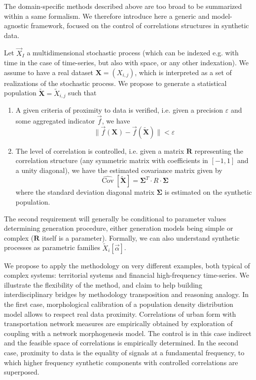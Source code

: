 \documentclass{bmcart}
\DeclareMathOperator{\Cov}{Cov}
\newcommand{\norm}[1]{\| #1 \|}
\begin{document}
The domain-specific methods described above are too broad to be summarized within a same formalism. We therefore introduce here a generic and model-agnostic framework, focused on the control of correlations structures in synthetic data.

Let $\vec{X}_I$ a multidimensional stochastic process (which can be indexed e.g. with time in the case of time-series, but also with space, or any other indexation). We assume to have a real dataset $\mathbf{X}=(X_{i,j})$, which is interpreted as a set of realizations of the stochastic process. We propose to generate a statistical population $\mathbf{\tilde{X}}=\tilde{X}_{i,j}$ such that
\begin{enumerate}
\item A given criteria of proximity to data is verified, i.e. given a precision $\varepsilon$ and some aggregated indicator $\vec{f}$, we have 
\begin{equation}
\label{eq:data-proximity}
\norm{\vec{f}(\mathbf{X})- \vec{f}(\mathbf{\tilde{X}})} < \varepsilon
\end{equation}
\item The level of correlation is controlled, i.e. given a matrix $\mathbf{R}$ representing the correlation structure (any symmetric matrix with coefficients in $[-1,1]$ and a unity diagonal), we have the estimated covariance matrix given by
\begin{equation}
\hat{\Cov{}{}}\left[\mathbf{\tilde{X}}\right] = \mathbf{\Sigma}^{T} \cdot R \cdot \mathbf{\Sigma}
\end{equation}
where the standard deviation diagonal matrix $\mathbf{\Sigma}$ is estimated on the synthetic population.
\end{enumerate}


The second requirement will generally be conditional to parameter values determining generation procedure, either generation models being simple or complex ($\mathbf{R}$ itself is a parameter). Formally,  we can also understand synthetic processes as parametric families $\tilde{X}_i[\vec{\alpha}]$.

We propose to apply the methodology on very different examples, both typical of complex systems: territorial systems and financial high-frequency time-series. We illustrate the flexibility of the method, and claim to help building interdisciplinary bridges by methodology transposition and reasoning analogy. In the first case, morphological calibration of a population density distribution model allows to respect real data proximity. Correlations of urban form with transportation network measures are empirically obtained by exploration of coupling with a network morphogenesis model. The control is in this case indirect and the feasible space of correlations is empirically determined. In the second case, proximity to data is the equality of signals at a fundamental frequency, to which higher frequency synthetic components with controlled correlations are superposed.
\end{document}

